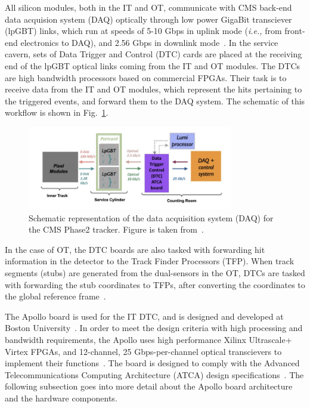 All silicon modules, both in the IT and OT, communicate with CMS back-end data acquision system (DAQ) 
optically through low power GigaBit transciever (lpGBT) links, which run at speeds of 5-10 Gbps
in uplink mode (\textit{i.e.,} from front-end electronics to DAQ), and 2.56 Gbps in downlink mode~\cite{CMS:TrackerUpgradeStatus}. 
In the service cavern, sets of Data Trigger and Control (DTC) cards are placed 
at the receiving end of the lpGBT optical links
coming from the IT and OT modules. The DTCs are high bandwidth processors based on commercial FPGAs. Their task
is to receive data from the IT and OT modules, which represent the hits pertaining to the triggered events, and
forward them to the DAQ system. The schematic of this workflow is shown in Fig.~\ref{fig:daq_schematic}.

\begin{figure}[htbp]
    \centering
    \includegraphics[width=0.8\textwidth]{TrackerUpgrade/daq_schematic.png}
    \caption{Schematic representation of the data acquisition system (DAQ) for the CMS Phase2 tracker.
    Figure is taken from~\cite{CMS:Phase2TrackerUpgrade}.}
    \label{fig:daq_schematic}
\end{figure}

In the case of OT, the DTC boards are also tasked with forwarding hit information in the detector to the Track
Finder Processors (TFP). When track segments (stubs) are generated from the dual-sensors in the OT, 
DTCs are tasked with forwarding the stub coordinates to TFPs, after converting the coordinates 
to the global reference frame~\cite{CMS:TrackerUpgradeStatus}. 

The Apollo board is used for the IT DTC, and is designed and developed at Boston University~\cite{CMS:ApolloPaper}.
In order to meet the design
criteria with high processing and bandwidth requirements, the Apollo uses high performance Xilinx Ultrascale+ Virtex
FPGAs, and 12-channel, 25 Gbps-per-channel optical transcievers to implement their functions~\cite{CMS:TrackerUpgradeStatus}.
The board is designed to comply with the Advanced Telecommunications Computing Architecture (ATCA) design 
specifications~\cite{PICMG:ATCA}.
The following subsection goes into more detail about the Apollo board architecture and the hardware components.

